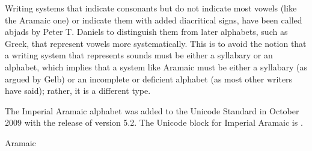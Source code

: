 Writing systems that indicate consonants but do not indicate most vowels (like the Aramaic one) or indicate them with added diacritical signs, have been called abjads by Peter T. Daniels to distinguish them from later alphabets, such as Greek, that represent vowels more systematically. This is to avoid the notion that a writing system that represents sounds must be either a syllabary or an alphabet, which implies that a system like Aramaic must be either a syllabary (as argued by Gelb) or an incomplete or deficient alphabet (as most other writers have said); rather, it is a different type.

The Imperial Aramaic alphabet was added to the Unicode Standard in October 2009 with the release of version 5.2.
The Unicode block for Imperial Aramaic is .

\begin{scriptexample}[]{Aramaic}
\end{scriptexample}




